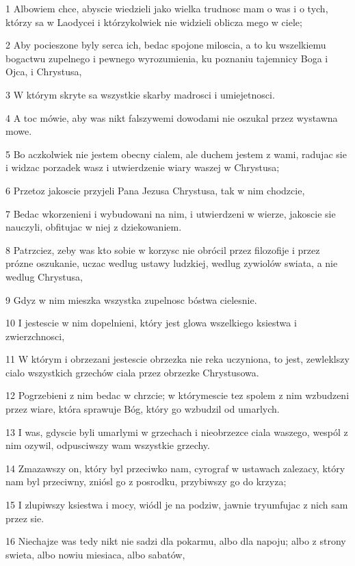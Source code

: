 \par 1 Albowiem chce, abyscie wiedzieli jako wielka trudnosc mam o was i o tych, którzy sa w Laodycei i którzykolwiek nie widzieli oblicza mego w ciele;
\par 2 Aby pocieszone byly serca ich, bedac spojone miloscia, a to ku wszelkiemu bogactwu zupelnego i pewnego wyrozumienia, ku poznaniu tajemnicy Boga i Ojca, i Chrystusa,
\par 3 W którym skryte sa wszystkie skarby madrosci i umiejetnosci.
\par 4 A toc mówie, aby was nikt falszywemi dowodami nie oszukal przez wystawna mowe.
\par 5 Bo aczkolwiek nie jestem obecny cialem, ale duchem jestem z wami, radujac sie i widzac porzadek wasz i utwierdzenie wiary waszej w Chrystusa;
\par 6 Przetoz jakoscie przyjeli Pana Jezusa Chrystusa, tak w nim chodzcie,
\par 7 Bedac wkorzenieni i wybudowani na nim, i utwierdzeni w wierze, jakoscie sie nauczyli, obfitujac w niej z dziekowaniem.
\par 8 Patrzciez, zeby was kto sobie w korzysc nie obrócil przez filozofije i przez prózne oszukanie, uczac wedlug ustawy ludzkiej, wedlug zywiolów swiata, a nie wedlug Chrystusa,
\par 9 Gdyz w nim mieszka wszystka zupelnosc bóstwa cielesnie.
\par 10 I jestescie w nim dopelnieni, który jest glowa wszelkiego ksiestwa i zwierzchnosci,
\par 11 W którym i obrzezani jestescie obrzezka nie reka uczyniona, to jest, zewleklszy cialo wszystkich grzechów ciala przez obrzezke Chrystusowa.
\par 12 Pogrzebieni z nim bedac w chrzcie; w którymescie tez spolem z nim wzbudzeni przez wiare, która sprawuje Bóg, który go wzbudzil od umarlych.
\par 13 I was, gdyscie byli umarlymi w grzechach i nieobrzezce ciala waszego, wespól z nim ozywil, odpusciwszy wam wszystkie grzechy.
\par 14 Zmazawszy on, który byl przeciwko nam, cyrograf w ustawach zalezacy, który nam byl przeciwny, zniósl go z posrodku, przybiwszy go do krzyza;
\par 15 I zlupiwszy ksiestwa i mocy, wiódl je na podziw, jawnie tryumfujac z nich sam przez sie.
\par 16 Niechajze was tedy nikt nie sadzi dla pokarmu, albo dla napoju; albo z strony swieta, albo nowiu miesiaca, albo sabatów,
